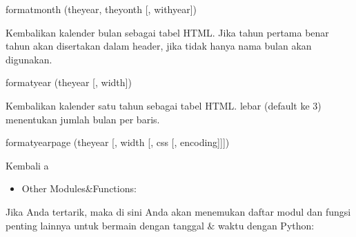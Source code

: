\vspace{12pt}
\noindent 
formatmonth (theyear, theyonth [, withyear]) \par
\noindent 
Kembalikan kalender bulan sebagai tabel HTML. Jika tahun pertama benar tahun akan disertakan dalam header, jika tidak hanya nama bulan akan digunakan. \par
\vspace{12pt}
\noindent 
formatyear (theyear [, width]) \par
\noindent 
Kembalikan kalender satu tahun sebagai tabel HTML. lebar (default ke 3) menentukan jumlah bulan per baris. \par
\vspace{12pt}
\noindent 
formatyearpage (theyear [, width [, css [, encoding]]]) \par
\noindent 
Kembali a \par
\vspace{12pt}
\noindent 
\begin{itemize}
\item Other Modules\&Functions:
\end{itemize}
\noindent 
Jika Anda tertarik, maka di sini Anda akan menemukan daftar modul dan fungsi penting lainnya untuk bermain dengan tanggal  $  \&  $ waktu dengan Python: \par
\vspace{12pt}
\vspace{12pt}
\vspace{12pt}
\vspace{12pt}

